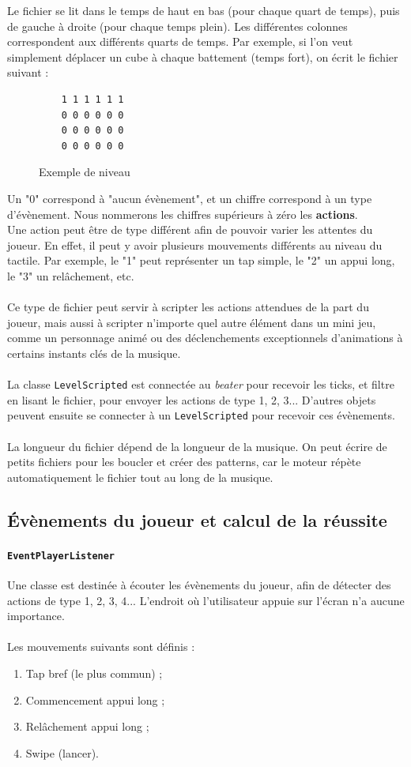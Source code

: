 Le fichier se lit dans le temps de haut en bas (pour chaque quart de temps), puis de gauche à droite (pour chaque temps plein). Les différentes colonnes correspondent aux différents quarts de temps. Par exemple, si l'on veut simplement déplacer un cube à chaque battement (temps fort), on écrit le fichier suivant :\\
\begin{figure}[!htb]
  \begin{lstlisting}
    1 1 1 1 1 1
    0 0 0 0 0 0
    0 0 0 0 0 0
    0 0 0 0 0 0
  \end{lstlisting}
\caption{Exemple de niveau}
\label{simple_level}
\end{figure}
Un "0" correspond à "aucun évènement", et un chiffre correspond à un type d'évènement. Nous nommerons les chiffres supérieurs à zéro les \textbf{actions}.
\\
Une action peut être de type différent afin de pouvoir varier les attentes du joueur. En effet, il peut y avoir plusieurs mouvements différents au niveau du tactile. Par exemple, le "1" peut représenter un tap simple, le "2" un appui long, le "3" un relâchement, etc.
\\\\
Ce type de fichier peut servir à scripter les actions attendues de la part du joueur, mais aussi à scripter n'importe quel autre élément dans un mini jeu, comme un personnage animé ou des déclenchements exceptionnels d'animations à certains instants clés de la musique.
\\\\
La classe \texttt{LevelScripted} est connectée au \textit{beater} pour recevoir les ticks, et filtre en lisant le fichier, pour envoyer les actions de type 1, 2, 3... D'autres objets peuvent ensuite se connecter à un \texttt{LevelScripted} pour recevoir ces évènements.
\\\\
La longueur du fichier dépend de la longueur de la musique. On peut écrire de petits fichiers pour les boucler et créer des patterns, car le moteur répète automatiquement le fichier tout au long de la musique.

\subsection{Évènements du joueur et calcul de la réussite}
\paragraph{\texttt{EventPlayerListener}}
Une classe est destinée à écouter les évènements du joueur, afin de détecter des actions de type 1, 2, 3, 4... L'endroit où l'utilisateur appuie sur l'écran n'a aucune importance.\\\\
Les mouvements suivants sont définis :
\begin{enumerate}
\item Tap bref (le plus commun) ;
\item Commencement appui long ;
\item Relâchement appui long ;
\item Swipe (lancer).
\end{enumerate}


